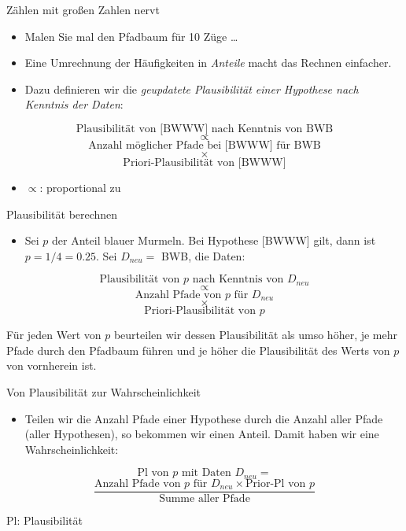 \documentclass[
  ngerman,
  ignorenonframetext,
]{beamer}
\providecommand{\tightlist}{%
  \setlength{\itemsep}{0pt}\setlength{\parskip}{0pt}}
\begin{document}
\begin{frame}{Zählen mit großen Zahlen nervt}
\protect\hypertarget{zuxe4hlen-mit-grouxdfen-zahlen-nervt}{}
\begin{itemize}
\item
  Malen Sie mal den Pfadbaum für 10 Züge \ldots{}
\item
  Eine Umrechnung der Häufigkeiten in \emph{Anteile} macht das Rechnen
  einfacher.
\item
  Dazu definieren wir die \emph{geupdatete Plausibilität einer Hypothese
  nach Kenntnis der Daten}:
\end{itemize}

\[\text{Plausibilität von [BWWW] nach Kenntnis von BWB}\] \[\propto\]
\[\text{Anzahl möglicher Pfade bei [BWWW] für BWB}\] \[\times\]
\[\text{Priori-Plausibilität von [BWWW]}\]

\begin{itemize}
\tightlist
\item
  \(\propto\): proportional zu
\end{itemize}
\end{frame}

\begin{frame}{Plausibilität berechnen}
\protect\hypertarget{plausibilituxe4t-berechnen}{}
\begin{itemize}
\tightlist
\item
  Sei \(p\) der Anteil blauer Murmeln. Bei Hypothese {[}BWWW{]} gilt,
  dann ist \(p=1/4 = 0.25\). Sei \(D_{neu} =\) BWB, die Daten:
\end{itemize}

\[\text{Plausibilität von }p\text{ nach Kenntnis von }D_{neu}\]
\[\propto\] \[\text{Anzahl Pfade von }p\text{ für }D_{neu}\] \[\times\]
\[\text{Priori-Plausibilität von }p\]

Für jeden Wert von \(p\) beurteilen wir dessen Plausibilität als umso
höher, je mehr Pfade durch den Pfadbaum führen und je höher die
Plausibilität des Werts von \(p\) von vornherein ist.
\end{frame}

\begin{frame}{Von Plausibilität zur Wahrscheinlichkeit}
\protect\hypertarget{von-plausibilituxe4t-zur-wahrscheinlichkeit}{}
\begin{itemize}
\tightlist
\item
  Teilen wir die Anzahl Pfade einer Hypothese durch die Anzahl aller
  Pfade (aller Hypothesen), so bekommen wir einen Anteil. Damit haben
  wir eine Wahrscheinlichkeit:
\end{itemize}

\[\text{Pl von }p\text{ mit Daten }D_{neu} =\]
\[\frac{\text{Anzahl Pfade von }p\text{ für }D_{neu}\times \text{Prior-Pl von }p}{\text{Summe aller Pfade}}\]

Pl: Plausibilität
\end{frame}
\end{document}
